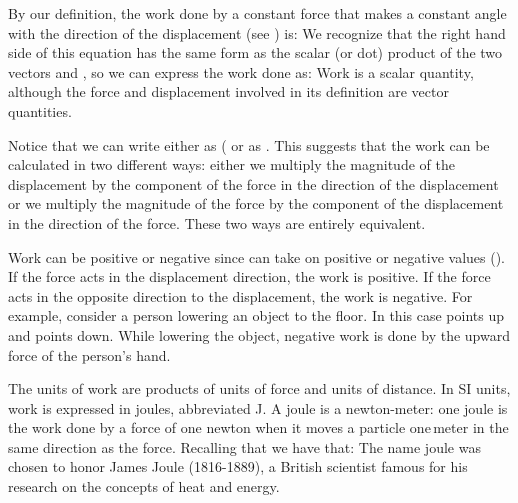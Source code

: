 {
By our definition, the work done by a constant force  that makes a
constant angle \m{\theta} with the direction of the displacement  (see
) is:
%
%
%
We recognize that the right hand side of this equation has the same form as
the scalar (or dot) product of the two vectors  and , so we
can express the work done as:
%
%
Work is a scalar quantity, although the force and displacement involved in
its definition are vector quantities.

Notice that we can write  either as
( or as .
This suggests that the work can be calculated in two different ways: either
we multiply the magnitude of the displacement by the component of the force
in the direction of the displacement or we multiply the magnitude of the
force by the component of the displacement in the direction of the force.
These two ways are entirely equivalent.

Work can be positive or negative since \m{\cos\theta} can take on
positive or negative values ().
If the force acts in the displacement direction, the work is positive.
If the force acts in the opposite direction to the displacement, the work is
negative.
For example, consider a person lowering an object to the floor.
In this case  points up and  points down.
While lowering the object, negative work is done by the upward
force of the person's hand.

The units of work
are products of units of force and units of distance.
In SI units, work is expressed in joules, abbreviated J.
A joule is a newton-meter: one joule is the work done by a force of one newton
when it moves a particle one\,\unit{meter} in the same direction as the force.
Recalling that  we have that:
%
%
The name joule was chosen to honor James Joule (1816-1889), a British
scientist famous for his research on the concepts of heat and energy.

}
